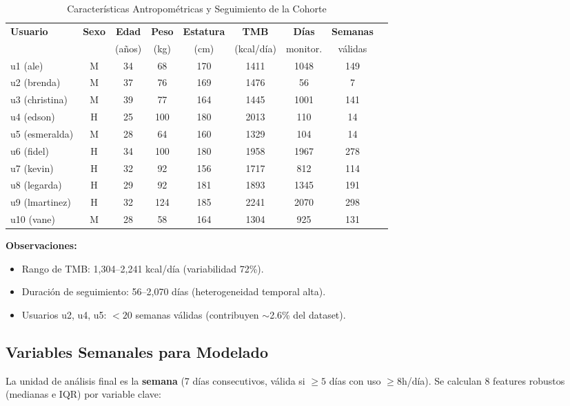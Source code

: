\documentclass[12pt,a4paper,twoside]{article}
\begin{document}
\begin{table}[h]
\centering
\caption{Características Antropométricas y Seguimiento de la Cohorte}
\label{tab:cohorte}
\small
\begin{tabular}{lcccccccc}
\toprule
\textbf{Usuario} & \textbf{Sexo} & \textbf{Edad} & \textbf{Peso} & \textbf{Estatura} & \textbf{TMB} & \textbf{Días} & \textbf{Semanas} \\
 &  & (años) & (kg) & (cm) & (kcal/día) & monitor. & válidas \\
\midrule
u1 (ale) & M & 34 & 68 & 170 & 1411 & 1048 & 149 \\
u2 (brenda) & M & 37 & 76 & 169 & 1476 & 56 & 7 \\
u3 (christina) & M & 39 & 77 & 164 & 1445 & 1001 & 141 \\
u4 (edson) & H & 25 & 100 & 180 & 2013 & 110 & 14 \\
u5 (esmeralda) & M & 28 & 64 & 160 & 1329 & 104 & 14 \\
u6 (fidel) & H & 34 & 100 & 180 & 1958 & 1967 & 278 \\
u7 (kevin) & H & 32 & 92 & 156 & 1717 & 812 & 114 \\
u8 (legarda) & H & 29 & 92 & 181 & 1893 & 1345 & 191 \\
u9 (lmartinez) & H & 32 & 124 & 185 & 2241 & 2070 & 298 \\
u10 (vane) & M & 28 & 58 & 164 & 1304 & 925 & 131 \\
\bottomrule
\end{tabular}
\end{table}

\textbf{Observaciones:}
\begin{itemize}
    \item Rango de TMB: 1,304--2,241 kcal/día (variabilidad 72\%).
    \item Duración de seguimiento: 56--2,070 días (heterogeneidad temporal alta).
    \item Usuarios u2, u4, u5: $<20$ semanas válidas (contribuyen $\sim$2.6\% del dataset).
\end{itemize}

\subsection{Variables Semanales para Modelado}

La unidad de análisis final es la \textbf{semana} (7 días consecutivos, válida si $\geq 5$ días con uso $\geq 8$h/día). Se calculan 8 features robustos (medianas e IQR) por variable clave:
\end{document}
